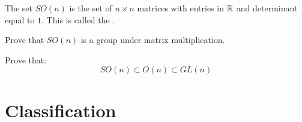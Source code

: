 \documentclass{ximera}
\begin{document}
\begin{definition}
  The set $SO(n)$ is the set of $n\times n$ matrices with entries in
  $\mathbb R$ and determinant equal to $1$. This is called the .
\end{definition}

\begin{exercise}
  Prove that $SO(n)$ is a group under matrix multiplication.
\end{exercise}


\begin{exercise}
  Prove that:
  \[
  SO(n) \subset O(n) \subset GL(n)
  \]
\end{exercise}

\section{Classification}
\end{document}
